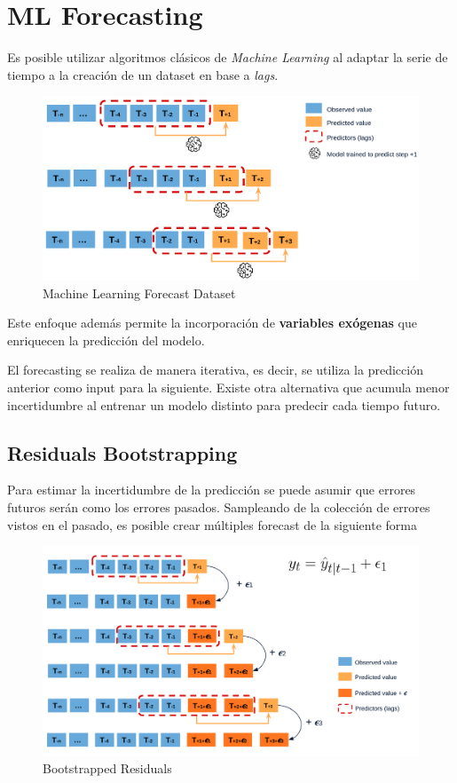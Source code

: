\section{ML Forecasting}

Es posible utilizar algoritmos clásicos de \textit{Machine Learning} al adaptar la serie de tiempo a la creación de un dataset en base a \textit{lags}. 

\begin{figure}[H]
    \center
    \includegraphics[scale=0.15]{notebooks/TS/img/ml_forecast.png}
    \caption{Machine Learning Forecast Dataset}
\end{figure}

Este enfoque además permite la incorporación de \textbf{variables exógenas} que enriquecen la predicción del modelo.

El forecasting se realiza de manera iterativa, es decir, se utiliza la predicción anterior como input para la siguiente. Existe otra alternativa que acumula menor incertidumbre al entrenar un modelo distinto para predecir cada tiempo futuro.

\subsection{Residuals Bootstrapping}

Para estimar la incertidumbre de la predicción se puede asumir que errores futuros serán como los errores pasados. Sampleando de la colección de errores vistos en el pasado, es posible crear múltiples forecast de la siguiente forma 

\begin{figure}[H]
    \center
    \includegraphics[scale=0.16]{notebooks/TS/img/boostrapped_residuals.png}
    \caption{Bootstrapped Residuals}
\end{figure}

